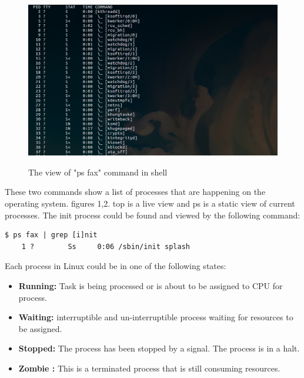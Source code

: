 \documentclass[journal,10pt,onecolumn,compsoc,letterpaper,draftclsnofoot,table,xcdraw]{IEEEtran} \usepackage[margin=0.75in]{geometry}
\begin{document}
\begin{figure}[h]
\centering
\includegraphics[width=150mm]{graphics/ps} \\
\caption{The view of "ps fax" command in shell}
\end{figure}

\noindent These two commands show a list of processes that are happening on the operating system. figures 1,2. top is a live view and ps is a static view of current processes. The init process could be found and viewed by the following command:
\begin{verbatim}
$ ps fax | grep [i]nit
    1 ?        Ss     0:06 /sbin/init splash
\end{verbatim}
\noindent Each process in Linux could be in one of the following states:
\begin{itemize}
\item \textbf{Running:} Task is being processed or is about to be assigned to CPU for process.
\item \textbf{Waiting:} interruptible and un-interruptible process waiting for resources to be assigned.
\item \textbf{Stopped:} The process has been stopped by a signal. The process is in a halt.
\item \textbf{Zombie :} This is a terminated process that is still consuming resources.
\end{itemize}
\end{document}
